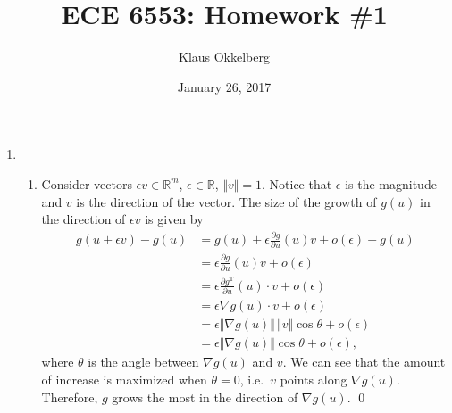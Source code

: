 \documentclass[letterpaper,12pt,titlepage]{article}
\newcommand{\trans}{^\text{T}}
\newcommand*\pder[2]{\frac{\partial #1}{\partial #2}}
\newcommand*\R{\mathbb{R}}
\begin{document}
\title{ECE 6553: Homework \#1}
\author{Klaus Okkelberg}
\date{January 26, 2017}
\maketitle


\begin{enumerate}[leftmargin=0pt]

\item \begin{enumerate}
  \item Consider vectors $\epsilon v\in\R^m$, $\epsilon\in\R$, $\Vert v\Vert=1$. Notice that $\epsilon$ is the magnitude and $v$ is the direction of the vector. The size of the growth of $g(u)$ in the direction of $\epsilon v$ is given by
    \begin{align}
      g(u+\epsilon v) - g(u) &= g(u) + \epsilon\pder{g}{u}(u)v + o(\epsilon) - g(u) \\
                             &= \epsilon\pder{g}{u}(u)v + o(\epsilon) \\
                             &= \epsilon \pder{g\trans}{u}(u) \cdot v + o(\epsilon) \\
                             &= \epsilon \nabla g(u) \cdot v + o(\epsilon) \\
                             &= \epsilon \Vert\nabla g(u)\Vert \, \Vert v\Vert \cos\theta + o(\epsilon) \\
                             &= \epsilon \Vert\nabla g(u)\Vert \cos\theta + o(\epsilon),
    \end{align}
    where $\theta$ is the angle between $\nabla g(u)$ and $v$. We can see that the amount of increase is maximized when $\theta=0$, i.e.\ $v$ points along $\nabla g(u)$. Therefore, $g$ grows the most in the direction of $\nabla g(u)$. \qed
    


\end{enumerate}
\end{enumerate}
\end{document}
